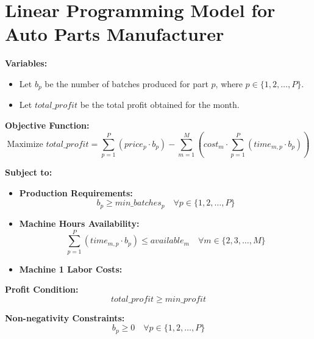 \documentclass{article}
\begin{document}
\section*{Linear Programming Model for Auto Parts Manufacturer}

\textbf{Variables:}
\begin{itemize}
    \item Let $b_p$ be the number of batches produced for part $p$, where $p \in \{1, 2, \ldots, P\}$.
    \item Let $total\_profit$ be the total profit obtained for the month.
\end{itemize}

\textbf{Objective Function:}
\[
\text{Maximize } total\_profit = \sum_{p=1}^{P} \left( price_p \cdot b_p \right) - \sum_{m=1}^{M} \left( cost_m \cdot \sum_{p=1}^{P} \left( time_{m,p} \cdot b_p \right) \right)
\]

\textbf{Subject to:}

\begin{itemize}
    \item \textbf{Production Requirements:} 
    \[
    b_p \geq min\_batches_p \quad \forall p \in \{1, 2, \ldots, P\}
    \]

    \item \textbf{Machine Hours Availability:} 
    \[
    \sum_{p=1}^{P} \left( time_{m,p} \cdot b_p \right) \leq available_m \quad \forall m \in \{2, 3, \ldots, M\}
    \]

    \item \textbf{Machine 1 Labor Costs:} 
    \end{itemize}

    \item \textbf{Profit Condition:} 
    \[
    total\_profit \geq min\_profit
    \]

\textbf{Non-negativity Constraints:}
\[
b_p \geq 0 \quad \forall p \in \{1, 2, \ldots, P\}
\]
\end{document}
